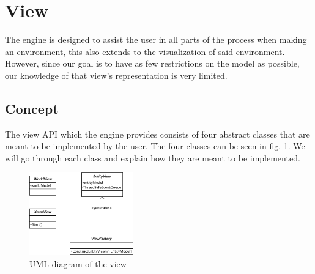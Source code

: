 
\section{View}

The engine is designed to assist the user in all parts of the process
when making an environment, this also extends to the visualization
of said environment. However, since our goal is to have as few restrictions
on the model as possible, our knowledge of that view\textquoteright{}s
representation is very limited.


\subsection{Concept}

The view API which the engine provides consists of four abstract classes
that are meant to be implemented by the user. The four classes can
be seen in fig. \ref{fig:ViewUMLView}. We will go through each class
and explain how they are meant to be implemented.

\begin{figure}
\begin{centering}
\includegraphics[width=0.4\textwidth]{ViewUmlDomainDiagram}
\par\end{centering}

\caption{UML diagram of the view\label{fig:ViewUMLView}}
\end{figure}

